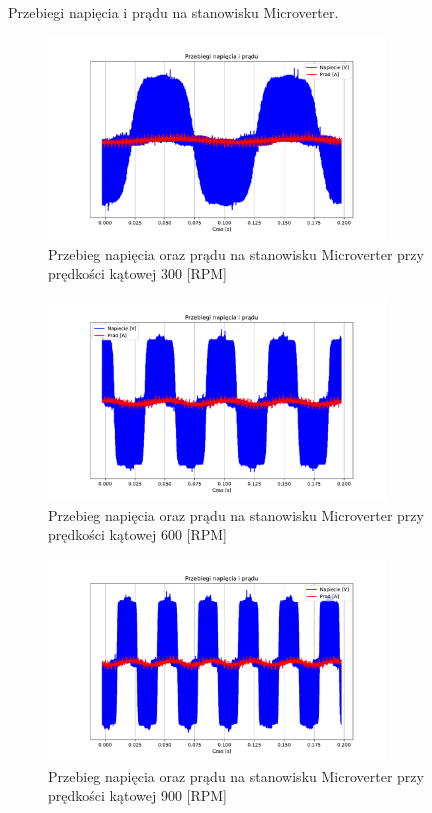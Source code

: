 \documentclass[11pt]{article}
\begin{document}
Przebiegi napięcia i prądu na stanowisku Microverter.\\

\begin{figure}[H]
\centering
\includegraphics[width=0.8\textwidth]{aun1_microverter_rpm300.pdf}
\caption{Przebieg napięcia oraz prądu na stanowisku Microverter przy prędkości kątowej 300 [RPM]}
\end{figure}

\begin{figure}[H]
\centering
\includegraphics[width=0.8\textwidth]{aun1_microverter_rpm600.pdf}
\caption{Przebieg napięcia oraz prądu na stanowisku Microverter przy prędkości kątowej 600 [RPM]}
\end{figure}

\begin{figure}[H]
\centering
\includegraphics[width=0.8\textwidth]{aun1_microverter_rpm900.pdf}
\caption{Przebieg napięcia oraz prądu na stanowisku Microverter przy prędkości kątowej 900 [RPM]}
\end{figure}
\end{document}
